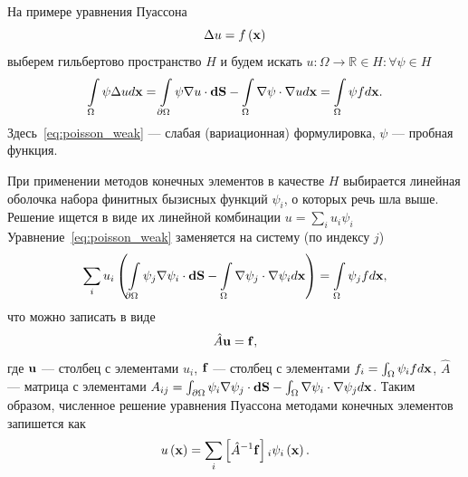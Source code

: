 \documentclass[oneside,final,12pt]{extreport}
\begin{document}
На примере уравнения Пуассона
\begin{equation} \Delta u = f\left(\vb x\right) \label{eq:poisson_strong}\end{equation}
выберем гильбертово пространство $H$ и будем искать
$u: \Omega \rightarrow \mathbb{R} \in H: \forall \psi \in H$
\begin{equation}
  \int\limits_\Omega \psi \Delta u d\vb x =
  \int\limits_{\partial\Omega} \psi \nabla u \cdot \vb{dS} -
    \int\limits_\Omega \nabla\psi \cdot \nabla u d\vb x =
  \int\limits_\Omega \psi f d\vb x.
\label{eq:poisson_weak}
\end{equation}
Здесь~\eqref{eq:poisson_weak} --- слабая (вариационная) формулировка,
$\psi$ --- пробная функция.

При применении методов конечных элементов в качестве $H$ выбирается линейная
оболочка набора финитных бызисных функций $\psi_i$, о которых речь шла выше.
Решение ищется в виде их линейной комбинации $u = \sum_i u_i\psi_i$
Уравнение~\eqref{eq:poisson_weak} заменяется на систему (по индексу $j$)
\begin{equation}
  \sum_i u_i \left(
    \int\limits_{\partial\Omega} \psi_j \nabla \psi_i \cdot \vb{dS} -
    \int\limits_\Omega \nabla\psi_j \cdot \nabla \psi_i d\vb x
  \right) =
  \int\limits_\Omega \psi_j f d\vb x,
\label{eq:poisson_FEM}
\end{equation}
что можно записать в виде
\begin{equation}
  \hat{A}\vb u = \vb f,
\label{eq:poisson_FEM_obscure}
\end{equation}
где $\vb u$ --- столбец с элементами $u_i$,
$\vb f$ --- столбец с элементами $f_i = \int_\Omega\psi_i f d\vb x$,
$\hat{A}$ --- матрица с элементами $A_{ij} =
  \int_{\partial\Omega} \psi_i \nabla \psi_j \cdot \vb{dS} -
    \int_\Omega \nabla\psi_i \cdot \nabla \psi_j d\vb x$.
Таким образом, численное решение уравнения Пуассона методами конечных элементов
запишется как
\begin{equation}
  u\left(\vb x\right) =
    \sum_i\left[\hat{A}^{-1}\vb f\right]{}_i\psi_i\left(\vb x\right).
\end{equation}
\end{document}
